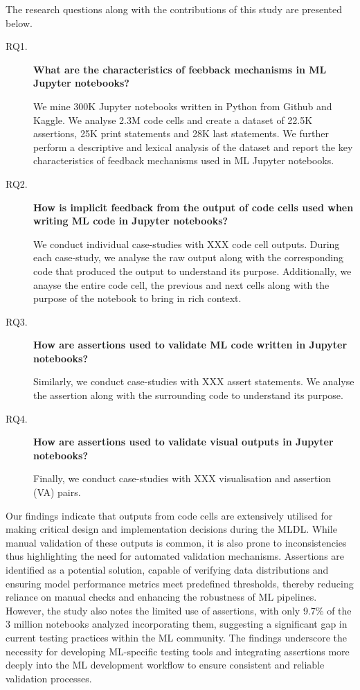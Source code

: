 The research questions along with the contributions of this study are presented below.

\begin{description}
  \item[RQ1.] \textbf{What are the characteristics of feebback mechanisms in ML Jupyter notebooks?}

  We mine 300K Jupyter notebooks written in Python from Github and Kaggle. We analyse 2.3M code cells and create a dataset of 22.5K assertions, 25K print statements and 28K last statements. We further perform a descriptive and lexical analysis of the dataset and report the key characteristics of feedback mechanisms used in ML Jupyter notebooks.
  

  \item[RQ2.] \textbf{How is implicit feedback from the output of code cells used when writing ML code in Jupyter notebooks?}

  We conduct individual case-studies with XXX code cell outputs. During each case-study, we analyse the raw output along with the corresponding code that produced the output to understand its purpose. Additionally, we anayse the entire code cell, the previous and next cells along with the purpose of the notebook to bring in rich context.

  \item[RQ3.] \textbf{How are assertions used to validate ML code written in Jupyter notebooks?}

  Similarly, we conduct case-studies with XXX assert statements. We analyse the assertion along with the surrounding code to understand its purpose.

  \item[RQ4.] \textbf{How are assertions used to validate visual outputs in Jupyter notebooks?}

  Finally, we conduct case-studies with XXX visualisation and assertion (VA) pairs.
\end{description}

Our findings indicate that outputs from code cells are extensively utilised for making critical design and implementation decisions during the MLDL. While manual validation of these outputs is common, it is also prone to inconsistencies thus highlighting the need for automated validation mechanisms. Assertions are identified as a potential solution, capable of verifying data distributions and ensuring model performance metrics meet predefined thresholds, thereby reducing reliance on manual checks and enhancing the robustness of ML pipelines. However, the study also notes the limited use of assertions, with only 9.7\% of the 3 million notebooks analyzed incorporating them, suggesting a significant gap in current testing practices within the ML community. The findings underscore the necessity for developing ML-specific testing tools and integrating assertions more deeply into the ML development workflow to ensure consistent and reliable validation processes.


